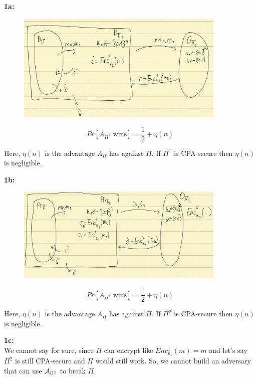\documentclass[12pt]{article}
\begin{document}
\newpage
\textbf{1a:}\\
\begin{figure}[h]
    \centering
    \includegraphics[width=10cm]{figures/f2.png}
\end{figure}

\begin{equation*}
Pr[A_{\Pi^1} \text{ wins}] = \frac12 + \eta(n)
\end{equation*}

Here, $\eta(n)$ is the advantage $A_\Pi$ has against $\Pi$.  If $\Pi^1$ is CPA-secure then $\eta(n)$ is negligible.



\textbf{1b:}\\
\begin{figure}[h]
    \centering
    \includegraphics[width=10cm]{figures/f3.png}
\end{figure}

\begin{equation*}
Pr[A_{\Pi^2} \text{ wins}] = \frac12 + \eta(n)
\end{equation*}

Here, $\eta(n)$ is the advantage $A_\Pi$ has against $\Pi$. If $\Pi^2$ is CPA-secure then $\eta(n)$ is negligible.

\textbf{1c:}\\
We cannot say for sure, since $\Pi$ can encrypt like $Enc_{k_1}^1(m)=m$ and let's say $\Pi^2$ is still CPA-secure and $\Pi$ would still work. So, we cannot build an adversary that can use $\mathcal{A}_{\Pi^1}$ to break $\Pi$.\\
\end{document}
